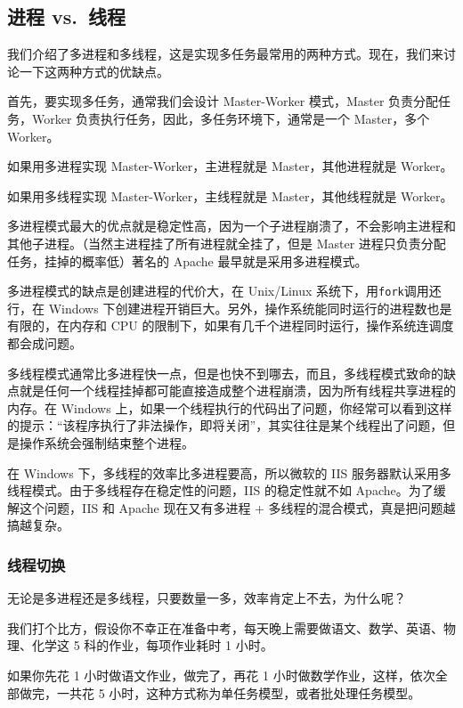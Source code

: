 \hypertarget{ux8fdbux7a0b-vs.-ux7ebfux7a0b}{%
\subsection{进程 vs.~线程}\label{ux8fdbux7a0b-vs.-ux7ebfux7a0b}}

我们介绍了多进程和多线程，这是实现多任务最常用的两种方式。现在，我们来讨论一下这两种方式的优缺点。

首先，要实现多任务，通常我们会设计 Master-Worker 模式，Master
负责分配任务，Worker 负责执行任务，因此，多任务环境下，通常是一个
Master，多个 Worker。

如果用多进程实现 Master-Worker，主进程就是 Master，其他进程就是 Worker。

如果用多线程实现 Master-Worker，主线程就是 Master，其他线程就是 Worker。

多进程模式最大的优点就是稳定性高，因为一个子进程崩溃了，不会影响主进程和其他子进程。（当然主进程挂了所有进程就全挂了，但是
Master 进程只负责分配任务，挂掉的概率低）著名的 Apache
最早就是采用多进程模式。

多进程模式的缺点是创建进程的代价大，在 Unix/Linux
系统下，用\texttt{fork}调用还行，在 Windows
下创建进程开销巨大。另外，操作系统能同时运行的进程数也是有限的，在内存和
CPU 的限制下，如果有几千个进程同时运行，操作系统连调度都会成问题。

多线程模式通常比多进程快一点，但是也快不到哪去，而且，多线程模式致命的缺点就是任何一个线程挂掉都可能直接造成整个进程崩溃，因为所有线程共享进程的内存。在
Windows
上，如果一个线程执行的代码出了问题，你经常可以看到这样的提示：``该程序执行了非法操作，即将关闭''，其实往往是某个线程出了问题，但是操作系统会强制结束整个进程。

在 Windows 下，多线程的效率比多进程要高，所以微软的 IIS
服务器默认采用多线程模式。由于多线程存在稳定性的问题，IIS 的稳定性就不如
Apache。为了缓解这个问题，IIS 和 Apache 现在又有多进程 +
多线程的混合模式，真是把问题越搞越复杂。

\hypertarget{ux7ebfux7a0bux5207ux6362}{%
\subsubsection{线程切换}\label{ux7ebfux7a0bux5207ux6362}}

无论是多进程还是多线程，只要数量一多，效率肯定上不去，为什么呢？

我们打个比方，假设你不幸正在准备中考，每天晚上需要做语文、数学、英语、物理、化学这
5 科的作业，每项作业耗时 1 小时。

如果你先花 1 小时做语文作业，做完了，再花 1
小时做数学作业，这样，依次全部做完，一共花 5
小时，这种方式称为单任务模型，或者批处理任务模型。

